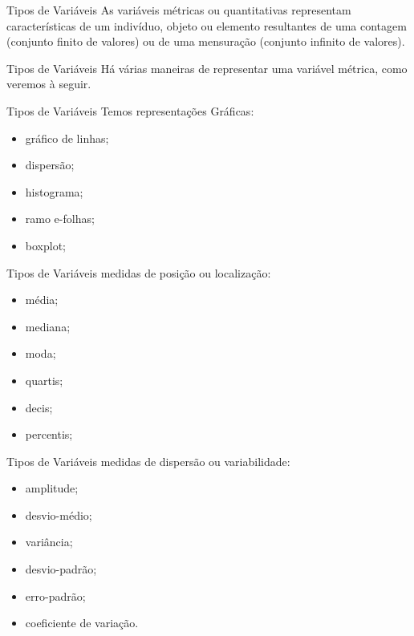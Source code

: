 \documentclass[10pt]{beamer}
\renewcommand{\indent}{\hspace*{2em}}
\theoremstyle{definition}
\begin{document}
\begin{frame}{Tipos de Variáveis}
\indent As variáveis métricas ou quantitativas representam características de um indivíduo, objeto ou elemento resultantes de uma contagem (conjunto finito de valores) ou de uma mensuração (conjunto infinito de valores).
\end{frame}

\begin{frame}{Tipos de Variáveis}
\indent Há várias maneiras de representar uma variável métrica, como veremos à seguir.
\end{frame}

\begin{frame}{Tipos de Variáveis}
Temos representações Gráficas:
\begin{itemize}
    \item gráfico de linhas;
    \item dispersão;
    \item histograma;
    \item ramo e-folhas;
    \item boxplot;
\end{itemize}
\end{frame}

\begin{frame}{Tipos de Variáveis}
medidas de posição ou localização: 
\begin{itemize}
    \item média;
    \item mediana;
    \item moda;
    \item quartis;
    \item decis;
    \item percentis;
\end{itemize}
\end{frame}

\begin{frame}{Tipos de Variáveis}
medidas de dispersão ou variabilidade:
\begin{itemize}
    \item amplitude;
    \item desvio-médio;
    \item variância;
    \item desvio-padrão;
    \item erro-padrão;
    \item coeficiente de variação.
\end{itemize}
\end{frame}
\end{document}
